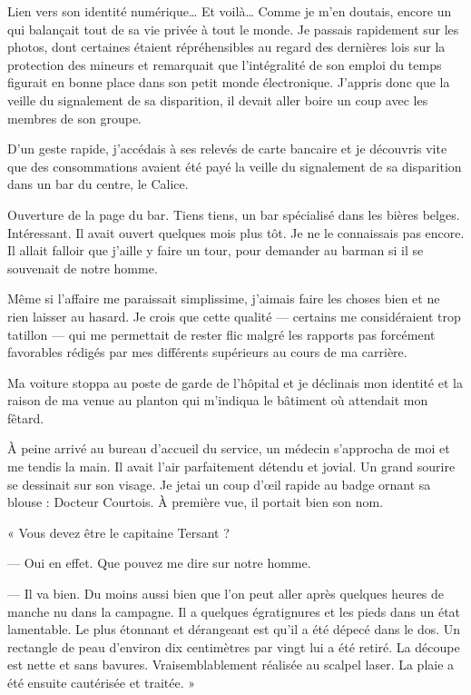 Lien vers son identité numérique… Et voilà… Comme je m'en doutais, encore un qui balançait tout de sa vie privée à tout
le monde. Je passais rapidement sur les photos, dont certaines étaient répréhensibles au regard des dernières lois sur
la protection des mineurs et remarquait que l'intégralité de son emploi du temps figurait en bonne place dans son petit
monde électronique. J'appris donc que la veille du signalement de sa disparition, il devait aller boire un coup avec
les membres de son groupe.

D'un geste rapide, j'accédais à ses relevés de carte bancaire et je découvris vite que des consommations avaient été
payé la veille du signalement de sa disparition dans un bar du centre, le Calice.

Ouverture de la page du bar. Tiens tiens, un bar spécialisé dans les bières belges. Intéressant. Il avait ouvert 
quelques mois plus tôt. Je ne le connaissais pas encore. Il allait falloir que j'aille y faire un tour, pour demander 
au barman si il se souvenait de notre homme.

Même si l'affaire me paraissait simplissime, j'aimais faire les choses bien et ne rien laisser au hasard. Je crois que
cette qualité — certains me considéraient trop tatillon — qui me permettait de rester flic malgré les rapports pas
forcément favorables rédigés par mes différents supérieurs au cours de ma carrière.

Ma voiture stoppa au poste de garde de l'hôpital et je déclinais mon identité et la raison de ma venue au planton qui
m'indiqua le bâtiment où attendait mon fêtard.

À peine arrivé au bureau d'accueil du service, un médecin s'approcha de moi et me tendis la main.
Il avait l'air parfaitement détendu et jovial. Un grand sourire se dessinait sur son visage. Je jetai un coup d'œil
rapide au badge ornant sa blouse : Docteur Courtois. À première vue, il portait bien son nom.

« Vous devez être le capitaine Tersant ?

— Oui en effet. Que pouvez me dire sur notre homme.

— Il va bien. Du moins aussi bien que l'on peut aller après quelques heures de manche nu dans la campagne. Il a
quelques égratignures et les pieds dans un état lamentable. Le plus étonnant et dérangeant est qu'il a été dépecé 
dans le dos. Un rectangle de peau d'environ dix centimètres par vingt lui a été retiré. La découpe est nette et sans 
bavures. Vraisemblablement réalisée au scalpel laser. La plaie a été ensuite cautérisée et traitée. »


